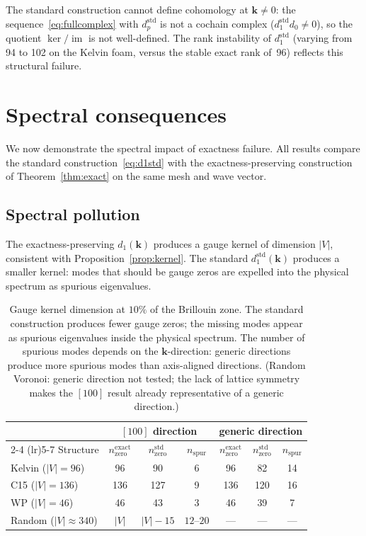 \documentclass[preprint,12pt]{elsarticle}
\begin{document}
The standard construction cannot define cohomology at $\mathbf{k} \neq 0$: the sequence~\eqref{eq:fullcomplex} with $d_p^{\mathrm{std}}$ is not a cochain complex ($d_1^{\mathrm{std}} d_0 \neq 0$), so the quotient $\ker/\operatorname{im}$ is not well-defined. The rank instability of $d_1^{\mathrm{std}}$ (varying from 94 to 102 on the Kelvin foam, versus the stable exact rank of~96) reflects this structural failure.

\section{Spectral consequences}
\label{sec:consequences}

We now demonstrate the spectral impact of exactness failure. All results compare the standard construction~\eqref{eq:d1std} with the exactness-preserving construction of Theorem~\ref{thm:exact} on the same mesh and wave vector.

\subsection{Spectral pollution}
\label{sec:pollution}

The exactness-preserving $d_1(\mathbf{k})$ produces a gauge kernel of dimension $|V|$, consistent with Proposition~\ref{prop:kernel}. The standard $d_1^{\mathrm{std}}(\mathbf{k})$ produces a smaller kernel: modes that should be gauge zeros are expelled into the physical spectrum as spurious eigenvalues.

\begin{table}[h]
\centering
\begin{tabular}{lcccccc}
\toprule
& \multicolumn{3}{c}{$[100]$ direction} & \multicolumn{3}{c}{generic direction} \\
\cmidrule(lr){2-4} \cmidrule(lr){5-7}
Structure & $n_{\mathrm{zero}}^{\mathrm{exact}}$ & $n_{\mathrm{zero}}^{\mathrm{std}}$ & $n_{\mathrm{spur}}$ & $n_{\mathrm{zero}}^{\mathrm{exact}}$ & $n_{\mathrm{zero}}^{\mathrm{std}}$ & $n_{\mathrm{spur}}$ \\
\midrule
Kelvin ($|V|{=}96$)  & 96  & 90  & 6  & 96  & 82  & 14 \\
C15 ($|V|{=}136$)    & 136 & 127 & 9  & 136 & 120 & 16 \\
WP ($|V|{=}46$)      & 46  & 43  & 3  & 46  & 39  & 7  \\
Random ($|V|{\approx}340$) & $|V|$ & $|V|{-}15$ & $12$--$20$ & --- & --- & --- \\
\bottomrule
\end{tabular}
\caption{Gauge kernel dimension at $10\%$ of the Brillouin zone. The standard construction produces fewer gauge zeros; the missing modes appear as spurious eigenvalues inside the physical spectrum. The number of spurious modes depends on the $\mathbf{k}$-direction: generic directions produce more spurious modes than axis-aligned directions. (Random Voronoi: generic direction not tested; the lack of lattice symmetry makes the $[100]$ result already representative of a generic direction.)}
\label{tab:pollution}
\end{table}
\end{document}
